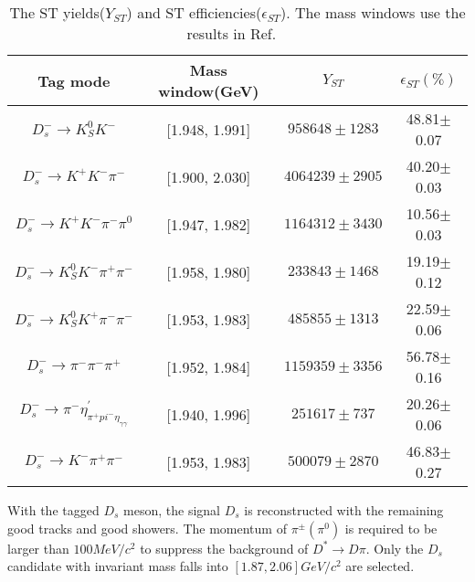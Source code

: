 {\begin{table}
    \caption{ The ST yields($Y_{ST}$) and ST efficiencies($\epsilon_{ST}$). The mass windows use the results in Ref. ~\cite{Doc-DB-630-v35} }
    \label{ST-eff}
    \begin{center}
        \begin{tabular}{cccc}
            \toprule
            Tag mode & Mass window(GeV)  & $Y_{ST}$  & $\epsilon_{ST}(\%)$\\
            \hline
            $D_{s}^{-} \rightarrow K_{S}^{0}K^{-}$                          & [1.948, 1.991]    & $958648\pm1283$               & 48.81$\pm$0.07\\
            $D_{s}^{-} \rightarrow K^{+}K^{-}\pi^{-}$                       & [1.900, 2.030]    & $4064239\pm2905$              & 40.20$\pm$0.03\\
            $D_{s}^{-} \rightarrow K^{+}K^{-}\pi^{-}\pi^{0}$                & [1.947, 1.982]    & $1164312\pm3430$              & 10.56$\pm$0.03\\
            $D_{s}^{-} \rightarrow K_{S}^{0}K^{-}\pi^{+}\pi^{-}$            & [1.958, 1.980]    & $233843\pm1468$               & 19.19$\pm$0.12\\
            $D_{s}^{-} \rightarrow K_{S}^{0}K^{+}\pi^{-}\pi^{-}$            & [1.953, 1.983]    & $485855\pm1313$               & 22.59$\pm$0.06\\
            $D_{s}^{-} \rightarrow \pi^{-}\pi^{-}\pi^{+}$                   & [1.952, 1.984]    & $1159359\pm3356$              & 56.78$\pm$0.16\\
            $D_{s}^{-} \rightarrow \pi^{-}\eta_{\pi^{+}pi^{-}\eta_{\gamma\gamma}}^{'}$          & [1.940, 1.996]    & $251617\pm737$               & 20.26$\pm$0.06\\
            $D_{s}^{-} \rightarrow K^{-}\pi^{+}\pi^{-}$                     & [1.953, 1.983]    & $500079\pm2870$               & 46.83$\pm$0.27\\
            \bottomrule
        \end{tabular}
    \end{center}
\end{table}



With the tagged $D_{s}$ meson, the signal $D_{s}$ is reconstructed with the remaining good tracks and good showers. 
The momentum of $\pi^{\pm}(\pi^{0})$ is required to be larger than $100 MeV/c^{2}$ to suppress the background of $D^{*} \rightarrow D\pi$.
Only the $D_{s}$ candidate with invariant mass falls into $[1.87, 2.06]GeV/c^{2}$ are selected.

}

